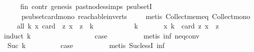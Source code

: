 \begin{isabellebody}
\ \ \ \isamarkupfalse%
\ fin\ contr\ genesis\ past{\isacharunderscore}{\kern0pt}nodes{\isachardot}{\kern0pt}simps\ psubsetI\isanewline
\ \ \ \ \ psubset{\isacharunderscore}{\kern0pt}card{\isacharunderscore}{\kern0pt}mono\ reachable{}{\isacharunderscore}{\kern0pt}in{\isacharunderscore}{\kern0pt}verts{\isacharparenleft}{\kern0pt}{}{\isacharparenright}{\kern0pt}\isanewline
\ \ \ \isamarkupfalse%
\ {\isacharparenleft}{\kern0pt}metis\ Collect{\isacharunderscore}{\kern0pt}mem{\isacharunderscore}{\kern0pt}eq\ Collect{\isacharunderscore}{\kern0pt}mono{\isacharparenright}{\kern0pt}\isanewline
\ \ \isamarkupfalse%
\ all{\isacharcolon}{\kern0pt}\ {\isachardoublequoteopen}{\isasymforall}k{\isachardot}{\kern0pt}\ {\isasymexists}x{\isachardot}{\kern0pt}\ card\ \ {\isacharbraceleft}{\kern0pt}z{\isachardot}{\kern0pt}\ x\ {\isasymrightarrow}\isactrlsup {\isacharplus}{\kern0pt}\ z{\isacharbraceright}{\kern0pt}\ {\isachargreater}{\kern0pt}\ k{\isachardoublequoteclose}\ \isanewline
\ \ \isamarkupfalse%
\ \isanewline
\ \ \ \ \isamarkupfalse%
\ k\ \isanewline
\ \ \ \ \isamarkupfalse%
\ {\isachardoublequoteopen}{\isasymexists}x{\isachardot}{\kern0pt}\ k\ {\isacharless}{\kern0pt}\ card\ {\isacharbraceleft}{\kern0pt}z{\isachardot}{\kern0pt}\ x\ {\isasymrightarrow}\isactrlsup {\isacharplus}{\kern0pt}\ z{\isacharbraceright}{\kern0pt}{\isachardoublequoteclose}\isanewline
\ \ \ \ \isamarkupfalse%
{\isacharparenleft}{\kern0pt}induct\ k{\isacharparenright}{\kern0pt}\isanewline
\ \ \ \ \ \ \isamarkupfalse%
\ {}\isanewline
\ \ \ \ \ \ \isamarkupfalse%
\ \isamarkupfalse%
\ {\isacharquery}{\kern0pt}case\isanewline
\ \ \ \ \ \ \ \ \isamarkupfalse%
\ {\isacharparenleft}{\kern0pt}metis\ inf\ neq{}{\isacharunderscore}{\kern0pt}conv{\isacharparenright}{\kern0pt}\ \isanewline
\ \ \ \ \isamarkupfalse%
\isanewline
\ \ \ \ \ \ \isamarkupfalse%
\ {\isacharparenleft}{\kern0pt}Suc\ k{\isacharparenright}{\kern0pt}\isanewline
\ \ \ \ \ \ \isamarkupfalse%
\ \isamarkupfalse%
\ {\isacharquery}{\kern0pt}case\isanewline
\ \ \ \ \ \ \ \ \isamarkupfalse%
\ {\isacharparenleft}{\kern0pt}metis\ Suc{\isacharunderscore}{\kern0pt}lessI\ inf{\isacharparenright}{\kern0pt}\ \isanewline
\ \ \ \ \isamarkupfalse%
\isanewline
\ \ \isamarkupfalse%
\isanewline
\ \ \isamarkupfalse%

\end{isabellebody}
